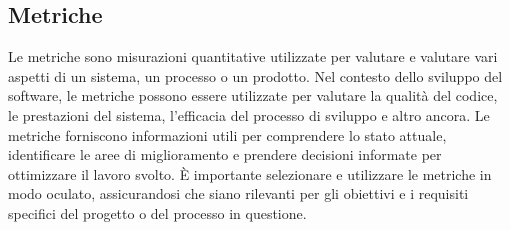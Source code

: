 \vspace{2em}
\subsection*{Metriche}
Le metriche sono misurazioni quantitative utilizzate per valutare e valutare vari aspetti di un sistema, un processo o un prodotto. Nel contesto dello sviluppo del software, le metriche possono essere utilizzate per valutare la qualità del codice, le prestazioni del sistema, l'efficacia del processo di sviluppo e altro ancora. Le metriche forniscono informazioni utili per comprendere lo stato attuale, identificare le aree di miglioramento e prendere decisioni informate per ottimizzare il lavoro svolto. È importante selezionare e utilizzare le metriche in modo oculato, assicurandosi che siano rilevanti per gli obiettivi e i requisiti specifici del progetto o del processo in questione.





